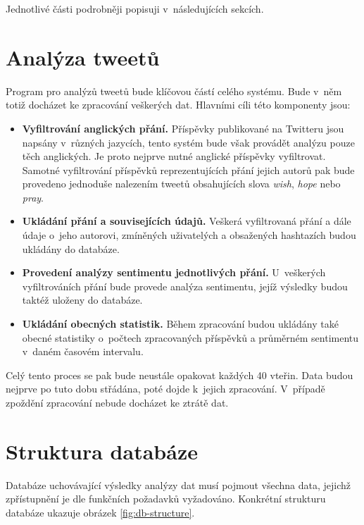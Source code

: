 \documentclass[thesis=B,czech]{FITthesis}[2012/06/26]
\begin{document}
\noindent Jednotlivé části podrobněji popisuji v~následujících sekcích. 

\section{Analýza tweetů}
	Program pro analýzů tweetů bude klíčovou částí celého systému. Bude v~něm totiž docházet ke zpracování veškerých dat. Hlavními cíli této komponenty jsou:
	
\begin{itemize}
\item \textbf{Vyfiltrování anglických přání.} Příspěvky publikované na Twitteru jsou napsány v~různých jazycích, tento systém bude však provádět analýzu pouze těch anglických. Je proto nejprve nutné anglické příspěvky vyfiltrovat. Samotné vyfiltrování příspěvků reprezentujících přání jejich autorů pak bude provedeno jednoduše nalezením tweetů obsahujících slova \textit{wish}, \textit{hope} nebo \textit{pray}. 
\item \textbf{Ukládání přání a souvisejících údajů.} Veškerá vyfiltrovaná přání a dále údaje o~jeho autorovi, zmíněných uživatelých a obsažených hashtazích budou ukládány do databáze. 
\item \textbf{Provedení analýzy sentimentu jednotlivých přání.} U~veškerých vyfiltrováních přání bude provede analýza sentimentu, jejíž výsledky budou taktéž uloženy do databáze. 
\item \textbf{Ukládání obecných statistik.} Během zpracování budou ukládány také obecné statistiky o~počtech zpracovaných příspěvků a průměrném sentimentu v~daném časovém intervalu. 
\end{itemize}

Celý tento proces se pak bude neustále opakovat každých 40 vteřin. Data budou nejprve po tuto dobu střádána, poté dojde k~jejich zpracování. V~případě zpoždění zpracování nebude docházet ke ztrátě dat. 

\section{Struktura databáze}
Databáze uchovávající výsledky analýzy dat musí pojmout všechna data, jejichž zpřístupnění je dle funkčních požadavků vyžadováno. Konkrétní strukturu databáze ukazuje obrázek \ref{fig:db-structure}. 
\end{document}
